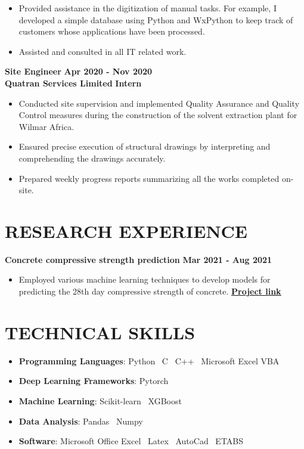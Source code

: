 \documentclass[letterpaper, 12pt]{article}
\newcommand{\cvsection}[1]{
	
	\section*{#1}
}
\newcommand{\verticalSpace}{4pt}
\begin{document}
	\begin{itemize}[leftmargin=*]
		
		\item Provided assistance in the digitization of manual tasks. For example, I developed a simple database using Python and WxPython to keep track of customers whose applications have been processed.
		\item Assisted and consulted in all IT related work. \\
		
	\end{itemize} 
	
	\textbf{Site Engineer} \hfill \textbf{Apr 2020 - Nov 2020} \\ [\verticalSpace]
	\textbf{Quatran Services Limited} \hfill \textbf{Intern}
	
	\begin{itemize}[leftmargin=*]
		
		\item Conducted site supervision and implemented Quality Assurance and Quality Control measures during the construction of the solvent extraction plant for Wilmar Africa.	
		\item Ensured precise execution of structural drawings by interpreting and comprehending the drawings accurately.
		\item Prepared weekly progress reports summarizing all the works completed on-site.

	\end{itemize}
	
	
	\cvsection{RESEARCH EXPERIENCE}
	
	\textbf{Concrete compressive strength prediction} \hfill \textbf{Mar 2021 - Aug 2021}
	
	\begin{itemize}[leftmargin=*]
		
		\item Employed various machine learning techniques to develop models for predicting the 28th day compressive strength of concrete. \href{https://www.github.com/patrickboateng/strength-prediction}{\underline{\textbf{Project link}}}
		
	\end{itemize}
	
	
	\cvsection{TECHNICAL SKILLS}
	
	\begin{itemize}[leftmargin=*]
		
		\item \textbf{Programming Languages}: Python \vrule \, C \vrule \, C++ \vrule \, Microsoft Excel VBA
		\item \textbf{Deep Learning Frameworks}: Pytorch
		\item \textbf{Machine Learning}: Scikit-learn \vrule \, XGBoost
		\item \textbf{Data Analysis}: Pandas \vrule \, Numpy
		\item \textbf{Software}: Microsoft Office Excel \vrule \, Latex \vrule \, AutoCad \vrule \, ETABS
		
	\end{itemize}
	
\end{document}
